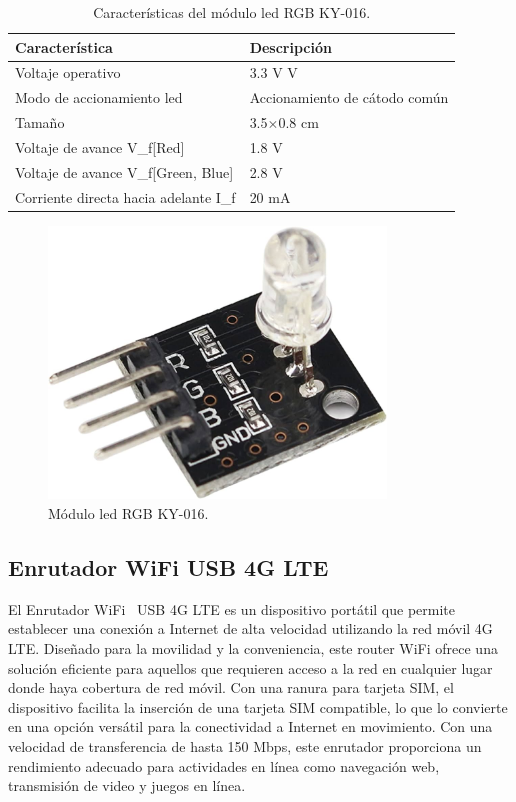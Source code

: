 \begin{table}[htbp]
\begin{center}
\caption{Características del módulo led RGB KY-016.}
\begin{tabular}{|l|l|} %
\hline
\rowcolor[HTML]{C0C0C0} 
\textbf{Característica} & \textbf{Descripción}\\ \hline
Voltaje operativo & 3.3 V\quad5 V\\ \hline
Modo de accionamiento led & Accionamiento de cátodo común \\ \hline
Tamaño & 3.5$\times$0.8 cm\\ \hline
Voltaje de avance V_{f}[Red] & 1.8 V \\ \hline
Voltaje de avance V_{f}[Green, Blue] & 2.8 V \\ \hline
Corriente directa hacia adelante I_{f} & 20 mA \\ \hline
\end{tabular}
\end{center}
\end{table}

\begin{figure}[h]
    \centering
    \includegraphics[width=0.8\textwidth]{img/herramientas/LedRGB.png}
    \caption{Módulo led RGB KY-016.} \label{Img:LedRGB}
\end{figure}

\subsection{Enrutador WiFi USB 4G LTE}
El Enrutador WiFi~\cite{misc:EnrutadorWifi} USB 4G LTE es un dispositivo portátil que permite establecer una conexión a Internet de alta velocidad utilizando la red móvil 4G LTE. Diseñado para la movilidad y la conveniencia, este router WiFi ofrece una solución eficiente para aquellos que requieren acceso a la red en cualquier lugar donde haya cobertura de red móvil. Con una ranura para tarjeta SIM, el dispositivo facilita la inserción de una tarjeta SIM compatible, lo que lo convierte en una opción versátil para la conectividad a Internet en movimiento. Con una velocidad de transferencia de hasta 150 Mbps, este enrutador proporciona un rendimiento adecuado para actividades en línea como navegación web, transmisión de video y juegos en línea.

